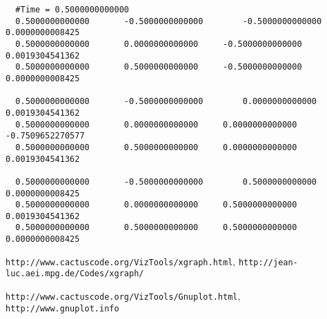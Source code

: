 \documentclass{article}
\begin{document}
\begin{verbatim}
  #Time = 0.5000000000000
  0.5000000000000		-0.5000000000000		-0.5000000000000		0.0000000008425
  0.5000000000000		0.0000000000000		-0.5000000000000		0.0019304541362
  0.5000000000000		0.5000000000000		-0.5000000000000		0.0000000008425

  0.5000000000000		-0.5000000000000		0.0000000000000		0.0019304541362
  0.5000000000000		0.0000000000000		0.0000000000000		-0.7509652270577
  0.5000000000000		0.5000000000000		0.0000000000000		0.0019304541362

  0.5000000000000		-0.5000000000000		0.5000000000000		0.0000000008425
  0.5000000000000		0.0000000000000		0.5000000000000		0.0019304541362
  0.5000000000000		0.5000000000000		0.5000000000000		0.0000000008425
\end{verbatim}

\begin{thebibliography}{9}

{\tt http://www.cactuscode.org/VizTools/xgraph.html}, {\tt http://jean-luc.aei.mpg.de/Codes/xgraph/}

{\tt http://www.cactuscode.org/VizTools/Gnuplot.html}, {\tt http://www.gnuplot.info}
\end{thebibliography}


\end{document}
